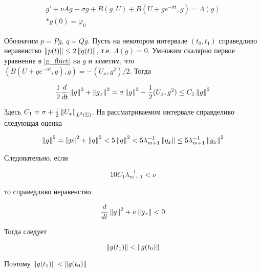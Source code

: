 \begin{gather}\label{g_fluct}
    g' + \nu Ag - \sigma g + B(g, U) + B(U + ge^{-\sigma t}, g) = \Lambda(g)\\*
    g(0) = \varphi_0
\end{gather}

Обозначим $p = Pg$, $q = Qg$. Пусть на некотором интервале $(t_0, t_1)$
справедливо неравенство $\left\lVert p(t)\right\rVert \le 2 \left\lVert q(t)\right\rVert$, т.е. $\Lambda(g) = 0$.
Умножим скалярно первое уравнение в \eqref{g_fluct} на $g$ и заметим, что $(B(U
+ g e^{-\sigma t}, g), g) = -(U_x, g^2) / 2$. Тогда

\begin{gather*}
    \frac{1}{2}\frac{d}{dt}\left\lVert g\right\rVert^2 + \left\lVert g_x\right\rVert^2 = \sigma \left\lVert g\right\rVert^2 -
    \frac{1}{2}(U_x, g^2) \le C_1\left\lVert g\right\rVert^2
\end{gather*}

Здесь $C_1 = \sigma + \frac{1}{2}\left\lVert U_{x}\right\rVert_{L^2(\Sigma)}$. На рассматриваемом 
интервале справделиво следующая оценка

\begin{gather*}
    \left\lVert g\right\rVert^2 = \left\lVert p\right\rVert^2 + \left\lVert q\right\rVert^2 < 5\left\lVert q\right\rVert^2 < 5\lambda^{-1}_{m +
    1}\left\lVert q_x\right\rVert \le 5 \lambda^{-1}_{m + 1}\left\lVert g_x\right\rVert^2
\end{gather*}

Следовательно, если 

\begin{equation}
    10C_1 \lambda_{m + 1}^{-1} < \nu
\end{equation}

то справедливо неравенство

\begin{equation}
    \frac{d}{dt}\left\lVert g\right\rVert^2 + \nu \left\lVert g_x\right\rVert < 0
\end{equation}

Тогда следует

\begin{equation}\label{8}
    \left\lVert g(t_1)\right\rVert < \left\lVert g(t_0)\right\rVert
\end{equation}

Поэтому $\left\lVert g(t_1)\right\rVert < \left\lVert g(t_0)\right\rVert$\\


